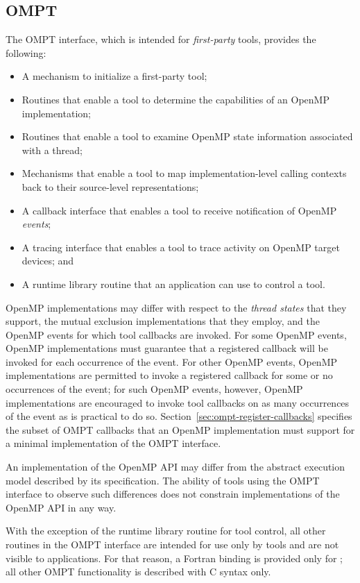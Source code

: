 \subsection{OMPT}

The OMPT interface, which is intended for \emph{first-party} tools,
provides the following:
\begin{itemize}
\item A mechanism to initialize a first-party tool;
\item Routines that enable a tool to determine the capabilities of an
      OpenMP implementation;
\item Routines that enable a tool to examine OpenMP state information 
      associated with a thread;
\item Mechanisms that enable a tool to map implementation-level calling
      contexts back to their source-level representations;
\item A callback interface that enables a tool to receive notification
      of OpenMP \emph{events};
\item A tracing interface that enables a tool to trace activity on OpenMP 
      target devices; and
\item A runtime library routine that an application can use to control a tool.
\end{itemize}

OpenMP implementations may differ with respect to the \emph{thread states} that
they support, the mutual exclusion implementations that they employ,
and the OpenMP events for which tool callbacks are invoked. For some OpenMP events,
OpenMP implementations must guarantee that a registered callback will be invoked 
for each occurrence of the event. For other OpenMP events, OpenMP implementations 
are permitted to invoke a registered callback for some or no occurrences of the 
event; for such OpenMP events, however, OpenMP implementations are encouraged to 
invoke tool callbacks on as many occurrences of the event as is practical to do so.
Section~\ref{sec:ompt-register-callbacks} specifies the subset of OMPT
callbacks that an OpenMP implementation must support for a minimal
implementation of the OMPT interface.

An implementation of the OpenMP API may differ from the
abstract execution model described by its specification.  The ability
of tools using the OMPT interface to observe such differences does not constrain
implementations of the OpenMP API in any way.

With the exception of the  runtime library routine for tool control,
all other routines in the OMPT interface are intended for use only by tools and
are not visible to applications.
For that reason, a Fortran binding is provided only
for ;
all other OMPT functionality is described with C syntax only.

